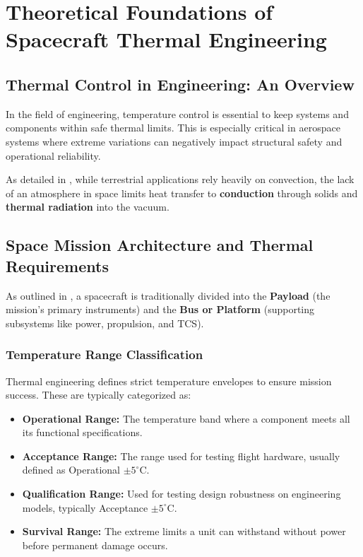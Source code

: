 \documentclass[12pt,a4paper]{report}
\begin{document}
\chapter{Theoretical Foundations of Spacecraft Thermal Engineering}

\section{Thermal Control in Engineering: An Overview}
In the field of engineering, temperature control is essential to keep systems and components within safe thermal limits. This is especially critical in aerospace systems where extreme variations can negatively impact structural safety and operational reliability. 

As detailed in \cite{th_background}, while terrestrial applications rely heavily on convection, the lack of an atmosphere in space limits heat transfer to \textbf{conduction} through solids and \textbf{thermal radiation} into the vacuum.

\section{Space Mission Architecture and Thermal Requirements}
As outlined in \cite{Cap_Libro}, a spacecraft is traditionally divided into the \textbf{Payload} (the mission's primary instruments) and the \textbf{Bus or Platform} (supporting subsystems like power, propulsion, and TCS).

\subsection{Temperature Range Classification}
Thermal engineering defines strict temperature envelopes to ensure mission success. These are typically categorized as:
\begin{itemize}
    \item \textbf{Operational Range:} The temperature band where a component meets all its functional specifications.
    \item \textbf{Acceptance Range:} The range used for testing flight hardware, usually defined as Operational $\pm 5^\circ$C.
    \item \textbf{Qualification Range:} Used for testing design robustness on engineering models, typically Acceptance $\pm 5^\circ$C.
    \item \textbf{Survival Range:} The extreme limits a unit can withstand without power before permanent damage occurs.
\end{itemize}
\end{document}
